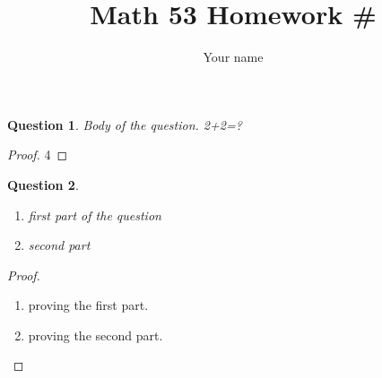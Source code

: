\documentclass[12pt]{article}
\title{Math 53 Homework \#}
\author{Your name}
\theoremstyle{break}
\newtheorem{hwquestion}{Question}
\numberwithin{theorem}{subsection}
\numberwithin{lemma}{subsection}
\numberwithin{corollary}{subsection}
\numberwithin{equation}{subsection}
\begin{document}
\maketitle
\begin{hwquestion}
Body of the question. 2+2=?
\end{hwquestion}
\begin{proof}
4
\end{proof}
\begin{hwquestion}
\	  %
	\begin{enumerate}
	\item first part of the question
	\item second part
    \end{enumerate}
\end{hwquestion}
\begin{proof}
\    %
	\begin{enumerate}
    \item proving the first part.
    \item proving the second part.
    \end{enumerate}
\end{proof}
\end{document}
